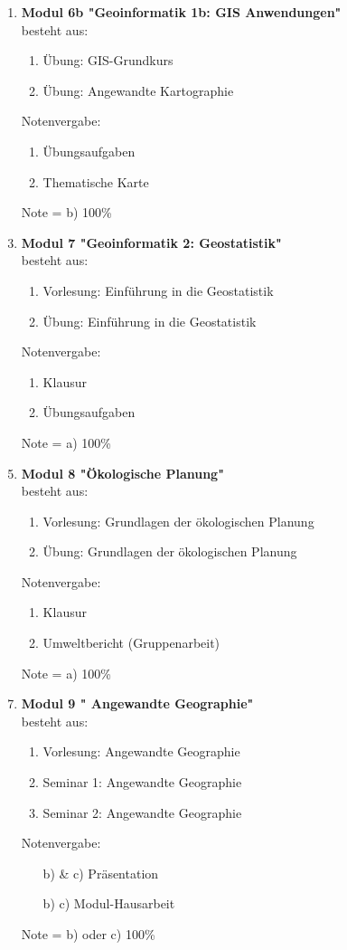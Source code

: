 \begin{enumerate}
 \item \textbf{Modul 6b "Geoinformatik 1b: GIS Anwendungen"}  \\ besteht aus:
  \begin{enumerate}
   \item Übung: GIS-Grundkurs
   \item Übung: Angewandte Kartographie
  \end{enumerate}
  Notenvergabe:
  \begin{enumerate}
   \item Übungsaufgaben
   \item Thematische Karte
  \end{enumerate}
  \item[] Note = b) 100\%
    
 \item \textbf{Modul 7 "Geoinformatik 2: Geostatistik"}  \\ besteht aus:
  \begin{enumerate}
   \item Vorlesung: Einführung in die Geostatistik
   \item Übung: Einführung in die Geostatistik
  \end{enumerate}
  Notenvergabe:
  \begin{enumerate}
   \item Klausur
   \item Übungsaufgaben
  \end{enumerate}
  \item[] Note = a) 100\%

 \item \textbf{Modul 8 "Ökologische Planung"}  \\ besteht aus:
  \begin{enumerate}
   \item Vorlesung: Grundlagen der ökologischen Planung
   \item Übung: Grundlagen der ökologischen Planung
  \end{enumerate}
  Notenvergabe:
  \begin{enumerate}
   \item Klausur
   \item Umweltbericht (Gruppenarbeit)
  \end{enumerate}
   \item[] Note = a) 100\%

 \item \textbf{Modul 9 " Angewandte Geographie"}  \\ besteht aus:
  \begin{enumerate}
   \item Vorlesung: Angewandte Geographie
   \item Seminar 1: Angewandte Geographie
   \item Seminar 2: Angewandte Geographie
  \end{enumerate}
  Notenvergabe:
  \begin{enumerate}
   \item[b) \& c)] Präsentation
   \item[b) \ODER c)]Modul-Hausarbeit
  \end{enumerate}
  \item[] Note = b) oder c) 100\%


\end{enumerate}
